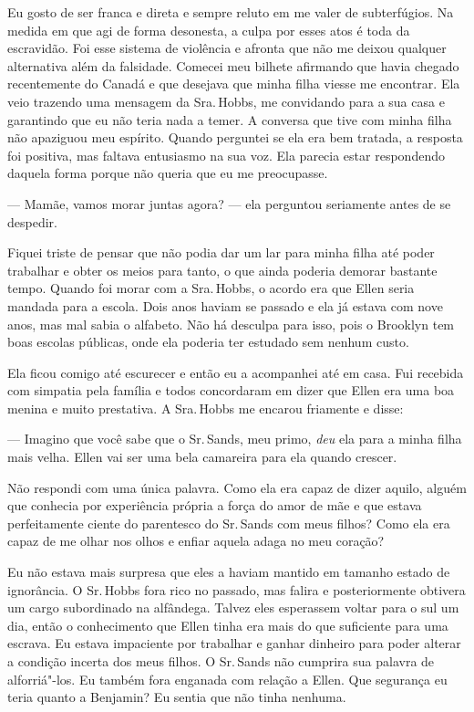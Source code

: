 Eu gosto de ser franca e direta e
sempre reluto em me valer de subterfúgios. Na medida em que agi de forma
desonesta, a culpa por esses atos é toda da escravidão. Foi esse sistema
de violência e afronta que não me deixou qualquer alternativa além da
falsidade. Comecei meu bilhete afirmando que havia chegado recentemente
do Canadá e que desejava que minha filha viesse me encontrar. Ela veio
trazendo uma mensagem da Sra.\,Hobbs, me convidando para a sua casa e
garantindo que eu não teria nada a temer. A conversa que tive com minha
filha não apaziguou meu espírito. Quando perguntei se ela era bem
tratada, a resposta foi positiva, mas faltava entusiasmo na sua voz. Ela
parecia estar respondendo daquela forma porque não queria que eu me
preocupasse.

--- Mamãe, vamos morar juntas agora? --- ela perguntou seriamente antes
de se despedir.

Fiquei triste de pensar que não podia dar um lar para minha filha até
poder trabalhar e obter os meios para tanto, o que ainda poderia demorar
bastante tempo. Quando foi morar com a Sra.\,Hobbs, o acordo era que
Ellen seria mandada para a escola. Dois anos haviam se passado e ela já
estava com nove anos, mas mal sabia o alfabeto. Não há desculpa para
isso, pois o Brooklyn tem boas escolas públicas, onde ela poderia ter
estudado sem nenhum custo.

Ela ficou comigo até escurecer e então
eu a acompanhei até em casa. Fui recebida com simpatia pela família e
todos concordaram em dizer que Ellen era uma boa menina e muito
prestativa. A Sra.\,Hobbs me encarou friamente e disse:

--- Imagino que você sabe que o Sr.\,Sands, meu primo, \emph{deu} ela
para a minha filha mais velha. Ellen vai ser uma bela camareira para ela
quando crescer.

Não respondi com uma única palavra. Como ela era capaz de dizer aquilo,
alguém que conhecia por experiência própria a força do amor de mãe e que
estava perfeitamente ciente do parentesco do Sr.\,Sands com meus filhos?
Como ela era capaz de me olhar nos olhos e enfiar aquela adaga no meu
coração?

Eu não estava mais surpresa que eles a
haviam mantido em tamanho estado de ignorância. O Sr.\,Hobbs fora rico no
passado, mas falira e posteriormente obtivera um cargo subordinado na
alfândega. Talvez eles esperassem voltar para o sul um dia, então o
conhecimento que Ellen tinha era mais do que suficiente para uma
escrava. Eu estava impaciente por trabalhar e ganhar dinheiro para poder
alterar a condição incerta dos meus filhos. O Sr.\,Sands não cumprira sua
palavra de alforriá"-los. Eu também fora enganada com relação a Ellen.
Que segurança eu teria quanto a Benjamin? Eu sentia que não tinha
nenhuma.

